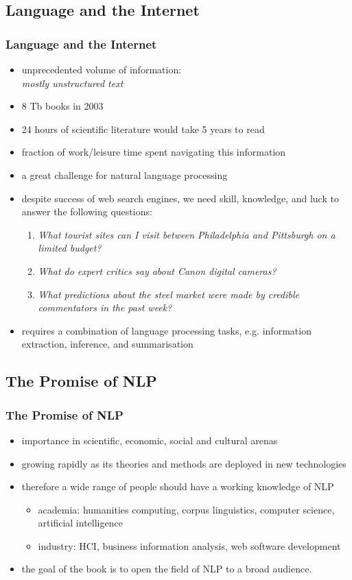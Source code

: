 \documentclass{beamer}             %
\begin{document}
\subsection{Language and the Internet}
\begin{frame}
\frametitle{Language and the Internet}
\small
\begin{itemize}
\item unprecedented volume of information:\\
  \emph{mostly unstructured text}
\item 8 Tb books in 2003
\item 24 hours of scientific literature would take 5 years to read
\item fraction of work/leisure time spent navigating this information
\item a great challenge for natural language processing
\item despite success of web search engines, we need skill, knowledge, and luck to answer the following questions:
  \begin{enumerate}
  \item \textit{What tourist sites can I visit between Philadelphia and Pittsburgh on a
    limited budget?}
  \item \textit{What do expert critics say about Canon digital cameras?}
  \item \textit{What predictions about the steel market were made by
      credible commentators in the past week?}
  \end{enumerate}
\item requires a combination of language processing tasks, e.g.
  information extraction, inference, and summarisation
\end{itemize}
\end{frame}

\subsection{The Promise of NLP}
\begin{frame}
\frametitle{The Promise of NLP}
\begin{itemize}
\item importance in scientific, economic, social and cultural arenas
\item growing rapidly as its theories and methods are deployed in new technologies
\item therefore a wide range of people should have a working knowledge of NLP
  \begin{itemize}
  \item academia: humanities computing, corpus linguistics, computer science, artificial intelligence
  \item industry: HCI, business information analysis, web software development
  \end{itemize}
\item the goal of the book is to open the field of NLP to a broad audience.
\end{itemize}
\end{frame}
\end{document}
